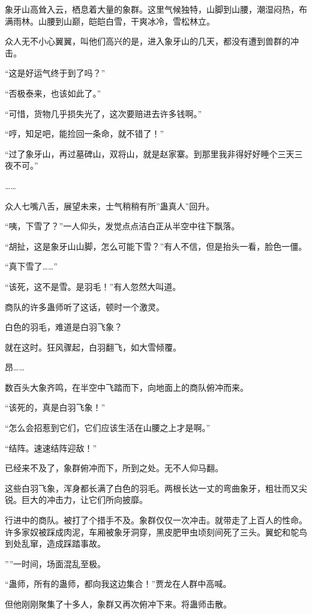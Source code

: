 \begin{this_body}
象牙山高耸入云，栖息着大量的象群。这里气候独特，山脚到山腰，潮湿闷热，布满雨林。山腰到山巅，皑皑白雪，干爽冰冷，雪松林立。

众人无不小心翼翼，叫他们高兴的是，进入象牙山的几天，都没有遭到兽群的冲击。

“这是好运气终于到了吗？”

“否极泰来，也该如此了。”

“可惜，货物几乎损失光了，这次要赔进去许多钱啊。”

“哼，知足吧，能捡回一条命，就不错了！”

“过了象牙山，再过墓碑山，双将山，就是赵家寨。到那里我非得好好睡个三天三夜不可。”

……

众人七嘴八舌，展望未来，士气稍稍有所”蛊真人”回升。

“咦，下雪了？”一人仰头，发觉点点洁白正从半空中往下飘落。

“胡扯，这是象牙山山脚，怎么可能下雪？”有人不信，但是抬头一看，脸色一僵。

“真下雪了……”

“该死，这不是雪。是羽毛！”有人忽然大叫道。

商队的许多蛊师听了这话，顿时一个激灵。

白色的羽毛，难道是白羽飞象？

就在这时。狂风骤起，白羽翻飞，如大雪倾覆。

昂……

数百头大象齐鸣，在半空中飞踏而下，向地面上的商队俯冲而来。

“该死的，真是白羽飞象！”

“怎么会招惹到它们，它们应该生活在山腰之上才是啊。”

“结阵。速速结阵迎敌！”

已经来不及了，象群俯冲而下，所到之处。无不人仰马翻。

这些白羽飞象，浑身都长满了白色的羽毛。两根长达一丈的弯曲象牙，粗壮而又尖锐。巨大的冲击力，让它们所向披靡。

行进中的商队。被打了个措手不及。象群仅仅一次冲击。就带走了上百人的性命。许多家奴被踩成肉泥，车厢被象牙洞穿，黑皮肥甲虫顷刻间死了三头。翼蛇和鸵鸟到处乱窜，造成踩踏事故。

””一时间，场面混乱至极。

“蛊师，所有的蛊师，都向我这边集合！”贾龙在人群中高喊。

但他刚刚聚集了十多人，象群又再次俯冲下来。将蛊师击散。


\end{this_body}
